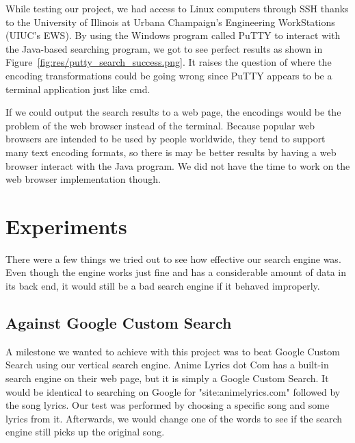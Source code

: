 \documentclass{acm} %
\begin{document}
\begin{CJK}{UTF8}{zhsong}

While testing our project, we had access to Linux computers through SSH thanks to the University of Illinois at Urbana Champaign's Engineering WorkStations (UIUC's EWS). By using the Windows program called PuTTY to interact with the Java-based searching program, we got to see perfect results as shown in Figure~\ref{fig:res/putty_search_success.png}. It raises the question of where the encoding transformations could be going wrong since PuTTY appears to be a terminal application just like cmd.


If we could output the search results to a web page, the encodings would be the problem of the web browser instead of the terminal. Because popular web browsers are intended to be used by people worldwide, they tend to support many text encoding formats, so there is may be better results by having a web browser interact with the Java program. We did not have the time to work on the web browser implementation though.

\section{Experiments}

There were a few things we tried out to see how effective our search engine was. Even though the engine works just fine and has a considerable amount of data in its back end, it would still be a bad search engine if it behaved improperly.


\subsection{Against Google Custom Search}

A milestone we wanted to achieve with this project was to beat Google Custom Search using our vertical search engine. Anime Lyrics dot Com has a built-in search engine on their web page, but it is simply a Google Custom Search. It would be identical to searching on Google for "site:animelyrics.com" followed by the song lyrics. Our test was performed by choosing a specific song and some lyrics from it. Afterwards, we would change one of the words to see if the search engine still picks up the original song.


\end{CJK}
\end{document}
